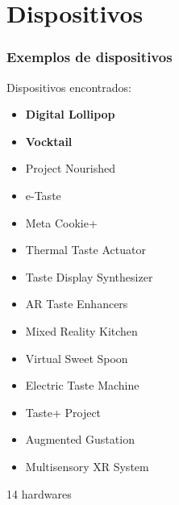 \documentclass{beamer}
\begin{document}
\section{Dispositivos}
\begin{frame}
  \frametitle{Exemplos de dispositivos}
  Dispositivos encontrados:
  \begin{multicols}{2}
    \begin{itemize}
      \item \textbf{Digital Lollipop}
      \item \textbf{Vocktail}
      \item Project Nourished
      \item e-Taste
      \item Meta Cookie+
      \item Thermal Taste Actuator
      \item Taste Display Synthesizer
      \item AR Taste Enhancers
      \item Mixed Reality Kitchen
      \item Virtual Sweet Spoon
      \item Electric Taste Machine
      \item Taste+ Project
      \item Augmented Gustation
      \item Multisensory XR System
    \end{itemize}
  \end{multicols}  
  \begin{flushright}
    \scriptsize
    14 hardwares
  \end{flushright}
\end{frame}
\end{document}
